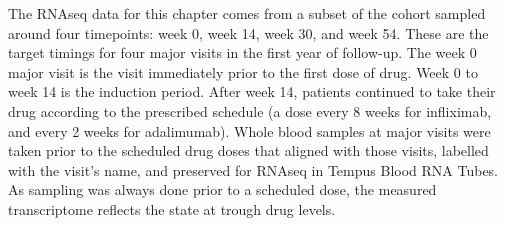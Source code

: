 %
%
%

%
The \gls{RNAseq} data for this chapter comes from a subset of the cohort sampled around four timepoints: week 0, week 14, week 30, and week 54.
These are the target timings for four major visits in the first year of follow-up.
The week 0 major visit is the visit immediately prior to the first dose of drug.
Week 0 to week 14 is the induction period.
After week 14, patients continued to take their drug according to the prescribed schedule (a dose every 8 weeks for infliximab, and every 2 weeks for adalimumab).
Whole blood samples at major visits were taken prior to the scheduled drug doses that aligned with those visits, labelled with the visit's name, and preserved for \gls{RNAseq} in Tempus Blood RNA Tubes.
As sampling was always done prior to a scheduled dose, the measured transcriptome reflects the state at trough drug levels.

